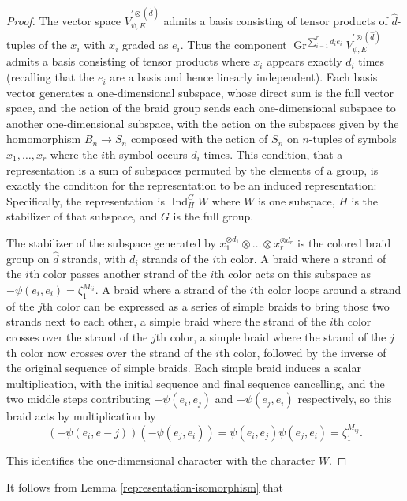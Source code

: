 \documentclass[11pt,letterpaper]{article}
\theoremstyle{definition}
\theoremstyle{remark}
\numberwithin{equation}{section}
\theoremstyle{dotless}
\newcommand{\Gr}{\operatorname{Gr}}
\newcommand{\hchi}{\psi} %
\newcommand{\gene}{\zeta_1} %
\begin{document}
\begin{proof} The vector space $V^{ '\otimes (\hat{d})}_{\hchi ,E}$ admits a basis consisting of tensor products of $\hat{d}$-tuples of the $x_i$ with $x_i$ graded as $e_i$. Thus the component $ \Gr^{ \sum_{i=1}^r d_i e_i} V^{ '\otimes (\hat{d})}_{\hchi ,E}$ admits a basis consisting of tensor products where $x_i$ appears exactly $d_i$ times (recalling that the $e_i$ are a basis and hence linearly independent). Each basis vector generates a one-dimensional subspace, whose direct sum is the full vector space, and the action of the braid group sends each one-dimensional subspace to another one-dimensional subspace, with the action on the subspaces given by the homomorphism $B_n \to S_n$ composed with the action of $S_n$ on $n$-tuples of symbols $x_1,\dots, x_r$ where the $i$th symbol occurs $d_i$ times. This condition, that a representation is a sum of subspaces permuted by the elements of a group, is exactly the condition for the representation to be an induced representation: Specifically, the representation is $\operatorname{Ind}_H^G W$ where $W$ is one subspace, $H$ is the stabilizer of that subspace, and $G$ is the full group.

The stabilizer of the subspace generated by $x_1^{ \otimes d_1} \otimes \dots\otimes x_r^{\otimes d_r}$ is the colored braid group on $\hat{d}$ strands, with $d_i$ strands of the $i$th color. A braid where a strand of the $i$th color passes another strand of the $i$th color acts on this subspace as $-\hchi(e_i,e_i) = \gene^{M_{ii}}$. A braid where a strand of the $i$th color loops around a strand of the $j$th color can be expressed as a series of simple braids to bring those two strands next to each other, a simple braid where the strand of the $i$th color crosses over the strand of the $j$th color, a simple braid where the strand of the $j$th color now crosses over the strand of the $i$th color, followed by the inverse of the original sequence of simple braids. Each simple braid induces a scalar multiplication, with the initial sequence and final sequence cancelling, and the two middle steps contributing $-\hchi(e_i,e_j)$ and $-\hchi(e_j,e_i)$ respectively, so this braid acts by multiplication by \[(-\hchi(e_i,e-j)) (-\hchi(e_j,e_i)) = \hchi(e_i,e_j)\hchi(e_j,e_i) = \gene^{M_{ij}}.\]

This identifies the one-dimensional character with the character $W$. \end{proof} 

It follows from Lemma \ref{representation-isomorphism} that
\end{document}
